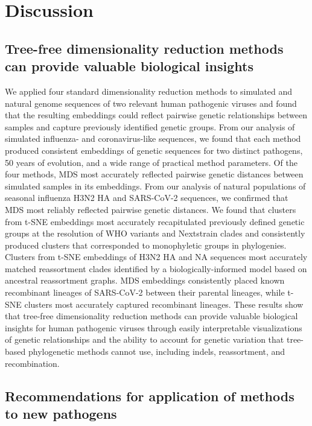 \documentclass[webpdf,contemporary,large,single]{oup-authoring-template}%
\theoremstyle{thmstyleone}%
\theoremstyle{thmstyletwo}%
\theoremstyle{thmstylethree}%
\begin{document}
\section{Discussion}

\subsection{Tree-free dimensionality reduction methods can provide valuable biological insights}

We applied four standard dimensionality reduction methods to simulated and natural genome sequences of two relevant human pathogenic viruses and found that the resulting embeddings could reflect pairwise genetic relationships between samples and capture previously identified genetic groups.
From our analysis of simulated influenza- and coronavirus-like sequences, we found that each method produced consistent embeddings of genetic sequences for two distinct pathogens, 50 years of evolution, and a wide range of practical method parameters.
Of the four methods, MDS most accurately reflected pairwise genetic distances between simulated samples in its embeddings.
From our analysis of natural populations of seasonal influenza H3N2 HA and SARS-CoV-2 sequences, we confirmed that MDS most reliably reflected pairwise genetic distances.
We found that clusters from t-SNE embeddings most accurately recapitulated previously defined genetic groups at the resolution of WHO variants and Nextstrain clades and consistently produced clusters that corresponded to monophyletic groups in phylogenies.
Clusters from t-SNE embeddings of H3N2 HA and NA sequences most accurately matched reassortment clades identified by a biologically-informed model based on ancestral reassortment graphs.
MDS embeddings consistently placed known recombinant lineages of SARS-CoV-2 between their parental lineages, while t-SNE clusters most accurately captured recombinant lineages.
These results show that tree-free dimensionality reduction methods can provide valuable biological insights for human pathogenic viruses through easily interpretable visualizations of genetic relationships and the ability to account for genetic variation that tree-based phylogenetic methods cannot use, including indels, reassortment, and recombination.

\subsection{Recommendations for application of methods to new pathogens}
\end{document}
